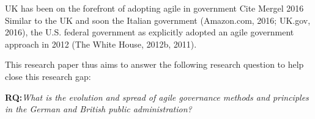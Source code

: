 
UK has been on the forefront of adopting agile in government 
Cite Mergel 2016
Similar to the UK and soon the Italian government (Amazon.com, 2016; UK.gov, 2016), the U.S. federal government as explicitly adopted an agile government approach in 2012 (The White House, 2012b, 2011). 





This research paper thus aims to answer the following research question to help close this research gap: 
\begin{addmargin}[2em]{2em}%
\textbf{RQ:}\textit{What is the evolution and spread of agile governance methods and principles in the German and British public administration?}\label{RQ1}
\end{addmargin}\par 